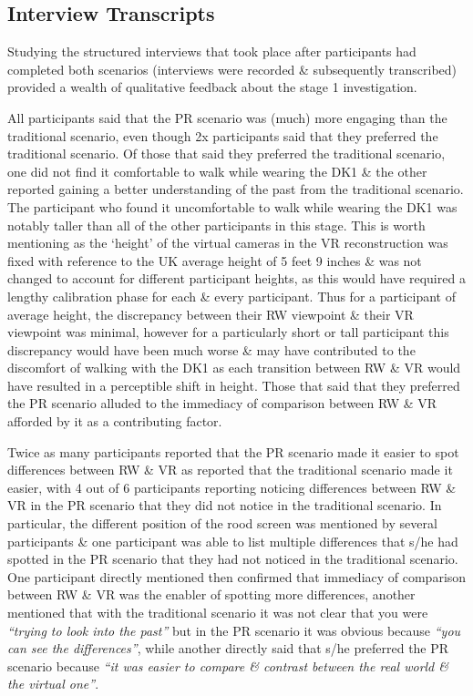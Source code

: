 
\subsection{Interview Transcripts}

Studying the structured interviews that took place after participants had completed both scenarios (interviews were recorded \& subsequently transcribed) provided a wealth of qualitative feedback about the stage 1 investigation.

All participants said that the PR scenario was (much) more engaging than the traditional scenario, even though 2x participants said that they preferred the traditional scenario. Of those that said they preferred the traditional scenario, one did not find it comfortable to walk while wearing the DK1 \& the other reported gaining a better understanding of the past from the traditional scenario. The participant who found it uncomfortable to walk while wearing the DK1 was notably taller than all of the other participants in this stage. This is worth mentioning as the `height' of the virtual cameras in the VR reconstruction was fixed with reference to the UK average height of 5 feet 9 inches \& was not changed to account for different participant heights, as this would have required a lengthy calibration phase for each \& every participant. Thus for a participant of average height, the discrepancy between their RW viewpoint \& their VR viewpoint was minimal, however for a particularly short or tall participant this discrepancy would have been much worse \& may have contributed to the discomfort of walking with the DK1 as each transition between RW \& VR would have resulted in a perceptible shift in height. Those that said that they preferred the PR scenario alluded to the immediacy of comparison between RW \& VR afforded by it as a contributing factor.

Twice as many participants reported that the PR scenario made it easier to spot differences between RW \& VR as reported that the traditional scenario made it easier, with 4 out of 6 participants reporting noticing differences between RW \& VR in the PR scenario that they did not notice in the traditional scenario. In particular, the different position of the rood screen was mentioned by several participants \& one participant was able to list multiple differences that s/he had spotted in the PR scenario that they had not noticed in the traditional scenario. One participant directly mentioned then confirmed that immediacy of comparison between RW \& VR was the enabler of spotting more differences, another mentioned that with the traditional scenario it was not clear that you were \textit{``trying to look into the past''} but in the PR scenario it was obvious because \textit{``you can see the differences''}, while another directly said that s/he preferred the PR scenario because \textit{``it was easier to compare \& contrast between the real world \& the virtual one''}.

